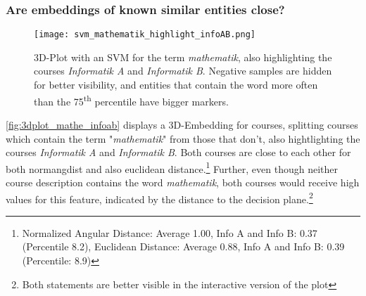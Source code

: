 \subsubsection{Are embeddings of known similar entities close?}

\begin{figure}[H]
	\centering
	\texttt{[image: svm\_mathematik\_highlight\_infoAB.png]}
	\caption[3D-Plot with an SVM for the term \textit{mathematik}]{
		\label{fig:3dplot_mathe_infoab}
		3D-Plot with an SVM for the term \textit{mathematik}, also highlighting the courses \textit{Informatik A} and \textit{Informatik B}. Negative samples are hidden for better visibility, and entities that contain the word more often than the 75\textsuperscript{th} percentile have bigger markers.
	}
\end{figure}

\autoref{fig:3dplot_mathe_infoab} displays a 3D-Embedding for courses, splitting courses which contain the term "\textit{mathematik}" from those that don't, also hightlighting the courses \textit{Informatik A} and \textit{Informatik B}. Both courses are close to each other for both \gls{normangdist} and also euclidean distance.\footnote{Normalized Angular Distance: Average 1.00, Info A and Info B: 0.37 (Percentile 8.2), Euclidean Distance: Average 0.88, Info A and Info B: 0.39 (Percentile: 8.9)}
Further, even though neither course description contains the word \textit{mathematik}, both courses would receive high values for this feature, indicated by the distance to the decision plane.\footnote{Both statements are better visible in the interactive version of the plot}







